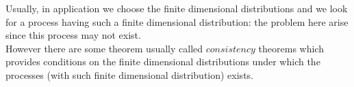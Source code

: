 Usually, in application we choose the finite dimensional distributions and we look for a process having such a finite dimensional distribution: the problem here arise since this process may not exist. \\
However there are some theorem usually called $consistency$ theorems which provides conditions on the finite dimensional distributions under which the processes (with such finite dimensional distribution) exists.













